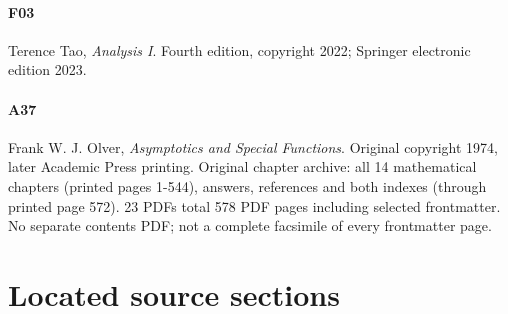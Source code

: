 \paragraph{F03} Terence Tao, \emph{Analysis I}. Fourth edition, copyright 2022; Springer electronic edition 2023.

\paragraph{A37} Frank W. J. Olver, \emph{Asymptotics and Special Functions}. Original copyright 1974, later Academic Press printing. Original chapter archive: all 14 mathematical chapters (printed pages 1-544), answers, references and both indexes (through printed page 572). 23 PDFs total 578 PDF pages including selected frontmatter. No separate contents PDF; not a complete facsimile of every frontmatter page.

\section*{Located source sections}

\small


